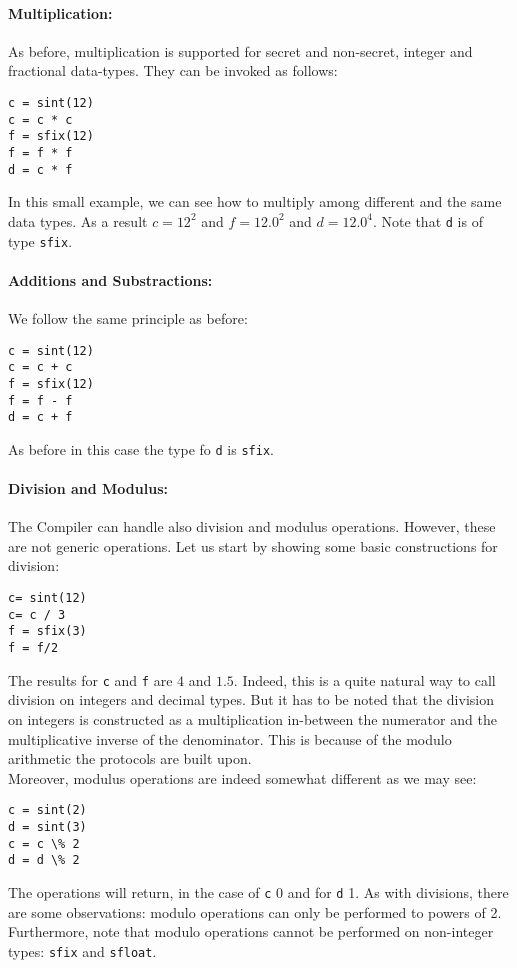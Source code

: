 \paragraph{Multiplication:}
As before, multiplication is supported for secret and non-secret, integer and fractional data-types. They can be invoked as follows: 

\begin{lstlisting}
c = sint(12)
c = c * c
f = sfix(12)
f = f * f
d = c * f
\end{lstlisting}
In this small example, we can see how to multiply among different and the same data types. As a result $c=12^2$ and $f=12.0^{2}$ and $d=12.0^{4}$. Note that \verb|d| is of type \verb|sfix|.  
\\
\paragraph{Additions and Substractions:}
We follow the same principle as before:
\begin{lstlisting}
c = sint(12)
c = c + c
f = sfix(12)
f = f - f
d = c + f
\end{lstlisting}
As before in this case the type fo \verb|d| is \verb|sfix|.
\\
\paragraph{Division and Modulus:}
The Compiler can handle also division and modulus operations. However, these are not generic operations. Let us start by showing some basic constructions for division: 
\begin{lstlisting}
c= sint(12)
c= c / 3
f = sfix(3)
f = f/2		
\end{lstlisting}
The results for \verb|c| and \verb|f| are $4$ and $1.5$. Indeed, this is a quite natural way to call division on integers and decimal types. But it has to be noted that the division on integers is constructed as a multiplication in-between the numerator and the multiplicative inverse of the denominator. This is because of the modulo arithmetic the protocols are built upon. 
\\ 
Moreover,  modulus operations are indeed somewhat different as we may see: 
\begin{lstlisting}
c = sint(2)
d = sint(3)
c = c \% 2
d = d \% 2
\end{lstlisting}
The operations will return, in the case of \verb|c| 0 and for \verb|d| 1. As with divisions, there are some observations: modulo operations can only be performed to powers of 2. Furthermore, note that modulo operations cannot be performed on non-integer types: \verb|sfix| and \verb|sfloat|.
\\
